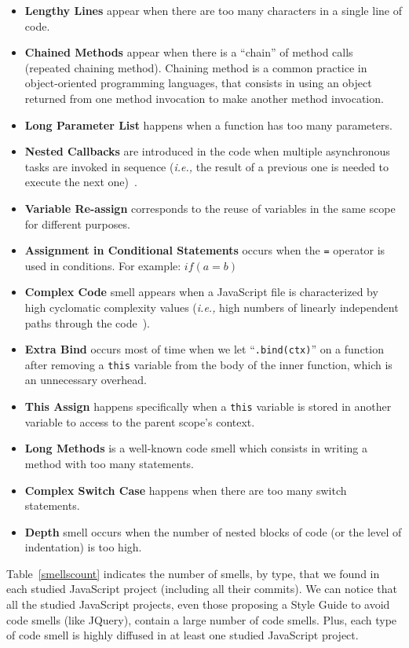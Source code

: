 \documentclass[smallcondensed]{svjour3}
\newcommand{\ie}{{\textit{i.e.,}}}
\begin{document}
\begin{itemize}
	\item \textbf{Lengthy Lines} appear when there are too many characters in a single line of code.
	\item \textbf{Chained Methods} appear when there is a ``chain'' of method calls (repeated chaining method). Chaining method is a common practice in object-oriented programming languages, that consists in using an object returned from one method invocation to make another method invocation.
	\item \textbf{Long Parameter List} happens when a function has too many parameters.
	\item \textbf{Nested Callbacks} are introduced in the code when multiple asynchronous tasks are invoked in sequence (\ie{} the result of a previous one is needed to execute the next one)~\cite{brodu2015toward, gallaba2015don}.
	\item \textbf{Variable Re-assign} corresponds to the reuse of variables in the same scope for different purposes.
	\item \textbf{Assignment in Conditional Statements} occurs when the \texttt{=} operator is used in conditions. For example: $if ( a = b )$
	\item \textbf{Complex Code} smell appears when a JavaScript file is characterized by high cyclomatic complexity values (\ie{} high numbers of linearly independent paths through the code~\cite{mccabe1976complexity}).
	\item \textbf{Extra Bind} occurs most of time when we let ``\texttt{.bind(ctx)}'' on a function after removing a \texttt{this} variable from the body of the inner function, which is an unnecessary overhead.
	\item \textbf{This Assign} happens specifically when a \texttt{this} variable is stored in another variable to access to the parent scope's context.
	\item \textbf{Long Methods} is a well-known code smell \cite{marinescu2006object, fard2013jsnose, fontana2012automatic} which consists in writing a method with too many statements.
	\item \textbf{Complex Switch Case} happens when there are too many switch statements.
	\item \textbf{Depth} smell occurs when the number of nested blocks of code (or the level of indentation) is too high.
\end{itemize}
{\color{blue}Table~\ref{smellscount} indicates the number of smells, by type, that we found in each studied JavaScript project (including all their commits). We can notice that all the studied JavaScript projects, even those proposing a Style Guide to avoid code smells (like JQuery), contain a large number of code smells. Plus, each type of code smell is highly diffused in at least one studied JavaScript project.}
\end{document}
